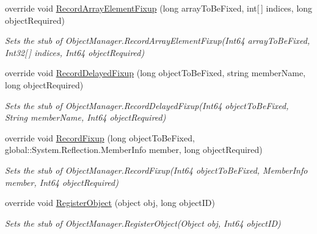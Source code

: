 \begin{DoxyCompactItemize}
override void \hyperlink{class_system_1_1_runtime_1_1_serialization_1_1_fakes_1_1_stub_object_manager_a3f5bbaac9dcf8c5cb758985ed3836a39}{Record\-Array\-Element\-Fixup} (long array\-To\-Be\-Fixed, int\mbox{[}$\,$\mbox{]} indices, long object\-Required)
\begin{DoxyCompactList}\small\item\em Sets the stub of Object\-Manager.\-Record\-Array\-Element\-Fixup(\-Int64 array\-To\-Be\-Fixed, Int32\mbox{[}$\,$\mbox{]} indices, Int64 object\-Required)\end{DoxyCompactList}\item 
override void \hyperlink{class_system_1_1_runtime_1_1_serialization_1_1_fakes_1_1_stub_object_manager_af0fb535380add67d1d9d5c619ef08801}{Record\-Delayed\-Fixup} (long object\-To\-Be\-Fixed, string member\-Name, long object\-Required)
\begin{DoxyCompactList}\small\item\em Sets the stub of Object\-Manager.\-Record\-Delayed\-Fixup(\-Int64 object\-To\-Be\-Fixed, String member\-Name, Int64 object\-Required)\end{DoxyCompactList}\item 
override void \hyperlink{class_system_1_1_runtime_1_1_serialization_1_1_fakes_1_1_stub_object_manager_a8dd5b441bcefa9c5c96dfb2d170a84e2}{Record\-Fixup} (long object\-To\-Be\-Fixed, global\-::\-System.\-Reflection.\-Member\-Info member, long object\-Required)
\begin{DoxyCompactList}\small\item\em Sets the stub of Object\-Manager.\-Record\-Fixup(\-Int64 object\-To\-Be\-Fixed, Member\-Info member, Int64 object\-Required)\end{DoxyCompactList}\item 
override void \hyperlink{class_system_1_1_runtime_1_1_serialization_1_1_fakes_1_1_stub_object_manager_af5930543d0c16d7dc7a22c4186f39f10}{Register\-Object} (object obj, long object\-I\-D)
\begin{DoxyCompactList}\small\item\em Sets the stub of Object\-Manager.\-Register\-Object(\-Object obj, Int64 object\-I\-D)\end{DoxyCompactList}\end{DoxyCompactItemize}
